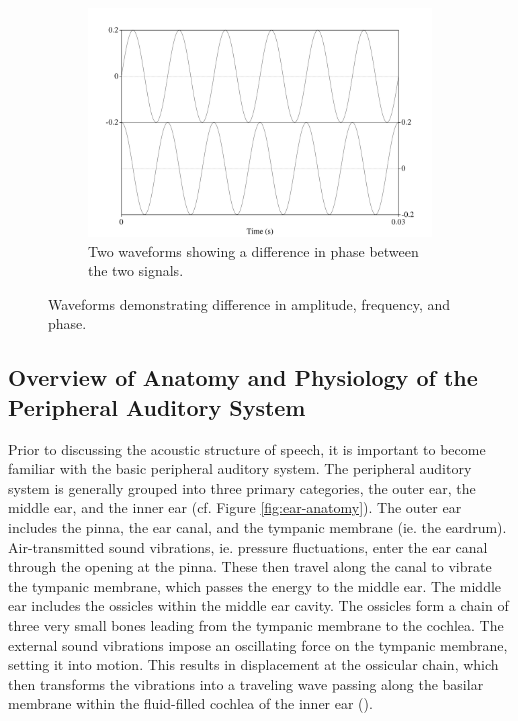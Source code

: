 \begin{figure}[H]
\begin{center}
\begin{subfigure}{0.5\textwidth}
  \includegraphics[width=\textwidth]{figure/basic-sound-phase.png}
  \caption{Two waveforms showing a difference in phase between the two signals.}
  \label{fig:basic-sound-phase}
\end{subfigure}
\end{center}
\caption{Waveforms demonstrating difference in amplitude, frequency, and phase.}
\label{fig:basic-sound-wave}
\end{figure}


\subsection{Overview of Anatomy and Physiology of the Peripheral Auditory System}

Prior to discussing the acoustic structure of speech, it is important to become familiar with the basic peripheral auditory system.  The peripheral auditory system is generally grouped into three primary categories, the outer ear, the middle ear, and the inner ear (cf. Figure \ref{fig:ear-anatomy}).  The outer ear includes the pinna, the ear canal, and the tympanic membrane (ie. the eardrum).  Air-transmitted sound vibrations, ie. pressure fluctuations, enter the ear canal through the opening at the pinna.  These then travel along the canal to vibrate the tympanic membrane, which passes the energy to the middle ear.  The middle ear includes the ossicles within the middle ear cavity.  The ossicles form a chain of three very small bones leading from the tympanic membrane to the cochlea. The external sound vibrations impose an oscillating force on the tympanic membrane, setting it into motion. This results in displacement at the ossicular chain, which then transforms the vibrations into a traveling wave passing along the basilar membrane within the fluid-filled cochlea of the inner ear (\cite{rosen:91}).

